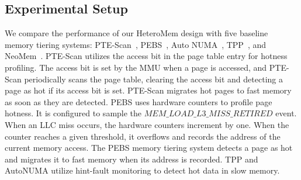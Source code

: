 
\subsection{Experimental Setup}

% 



We compare the performance of our HeteroMem design with five baseline memory tiering systems: PTE-Scan~\cite{damon}, PEBS~\cite{pebs_events}, Auto NUMA~\cite{corbet2012autonuma}, TPP~\cite{tpp_asplos23}, and NeoMem~\cite{neomem}. PTE-Scan utilizes the access bit in the page table entry for hotness profiling. The access bit is set by the MMU when a page is accessed, and PTE-Scan periodically scans the page table, clearing the access bit and detecting a page as hot if its access bit is set. PTE-Scan migrates hot pages to fast memory as soon as they are detected.
PEBS uses hardware counters to profile page hotness. It is configured to sample the $MEM\_LOAD\_L3\_MISS\_RETIRED$ event. When an LLC miss occurs, the hardware counters increment by one. When the counter reaches a given threshold, it overflows and records the address of the current memory access. The PEBS memory tiering system detects a page as hot and migrates it to fast memory when its address is recorded.
TPP and AutoNUMA utilize hint-fault monitoring to detect hot data in slow memory.
